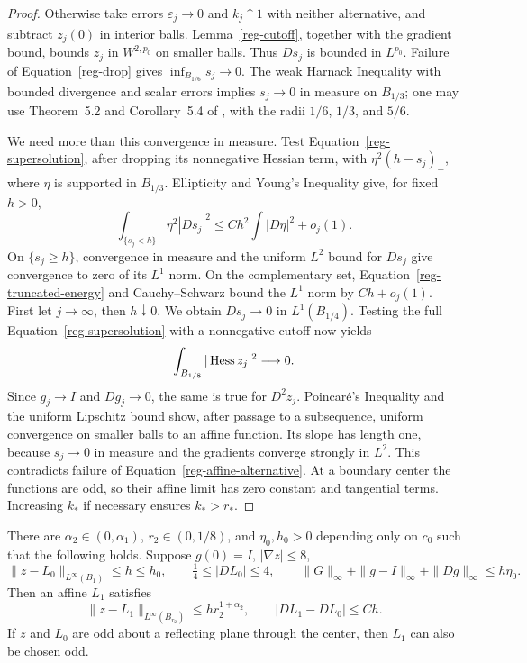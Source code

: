 \begin{proof}
Otherwise take errors $\varepsilon_j\to0$ and $k_j\uparrow1$
with neither alternative, and subtract $z_j(0)$ in interior balls.
Lemma~\ref{reg-cutoff}, together with the gradient bound, bounds
$z_j$ in $W^{2,p_0}$ on smaller balls. Thus $Ds_j$ is bounded in
$L^{p_0}$. Failure of Equation~\eqref{reg-drop} gives
$\inf_{B_{1/6}}s_j\to0$. The weak Harnack Inequality with bounded
divergence and scalar errors implies $s_j\to0$ in measure on
$B_{1/3}$; one may use Theorem~5.2 and Corollary~5.4 of
\cite{trudinger1973}, with the radii $1/6$, $1/3$, and $5/6$.

We need more than this convergence in measure. Test
Equation~\eqref{reg-supersolution}, after dropping its nonnegative
Hessian term, with $\eta^2(h-s_j)_+$, where $\eta$ is supported
in $B_{1/3}$. Ellipticity and Young's Inequality give, for fixed
$h>0$,
\begin{equation}
 \int_{\{s_j<h\}}\eta^2|Ds_j|^2
       \le Ch^2\int|D\eta|^2+o_j(1).
 \label{reg-truncated-energy}
\end{equation}
On $\{s_j\ge h\}$, convergence in measure and the uniform
$L^2$ bound for $Ds_j$ give convergence to zero of its $L^1$
norm. On the complementary set, Equation~\eqref{reg-truncated-energy}
and Cauchy--Schwarz bound the $L^1$ norm by $Ch+o_j(1)$.
First let $j\to\infty$, then $h\downarrow0$. We obtain
$Ds_j\to0$ in $L^1(B_{1/4})$. Testing the full
Equation~\eqref{reg-supersolution} with a nonnegative cutoff now
yields
\[
 \int_{B_{1/8}}|\operatorname{Hess} z_j|^2\longrightarrow0.
\]
Since $g_j\to I$ and $Dg_j\to0$, the same is true for $D^2z_j$.
Poincar\'e's Inequality and the uniform Lipschitz bound show, after
passage to a subsequence, uniform convergence on smaller balls to
an affine function. Its slope has length one, because $s_j\to0$
in measure and the gradients converge strongly in $L^2$.
This contradicts failure of Equation~\eqref{reg-affine-alternative}.
At a boundary center the functions are odd, so their affine limit
has zero constant and tangential terms. Increasing $k_*$ if
necessary ensures $k_*>r_*$.
\end{proof}

\begin{lemma}
\label{reg-improvement}
There are $\alpha_2\in(0,\alpha_1)$, $r_2\in(0,1/8)$, and
$\eta_0,h_0>0$ depending only on $c_0$ such that the following
holds. Suppose $g(0)=I$, $|\nabla z|\le8$,
\[
 \|z-L_0\|_{L^\infty(B_1)}\le h\le h_0,
 \qquad \tfrac14\le |DL_0|\le4,
 \qquad
 \|G\|_\infty+\|g-I\|_\infty+\|Dg\|_\infty\le h\eta_0.
\]
Then an affine $L_1$ satisfies
\begin{equation}
 \|z-L_1\|_{L^\infty(B_{r_2})}
       \le h r_2^{1+\alpha_2},\qquad
 |DL_1-DL_0|\le Ch.
 \label{reg-improved-flatness}
\end{equation}
If $z$ and $L_0$ are odd about a reflecting plane through the
center, then $L_1$ can also be chosen odd.
\end{lemma}

